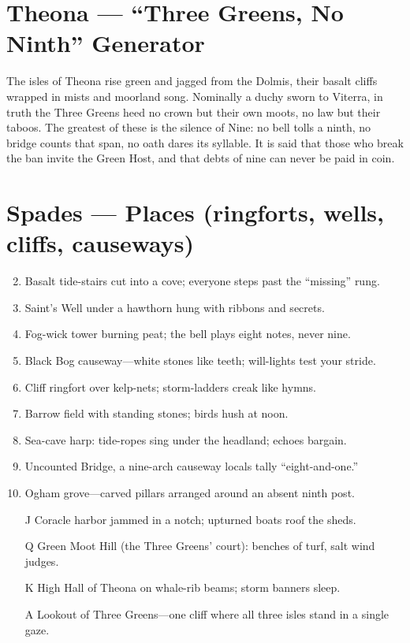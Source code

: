 \section{Theona --- ``Three Greens, No Ninth'' Generator}
\label{chap:theona}

The isles of Theona rise green and jagged from the Dolmis, their basalt cliffs wrapped in mists and moorland song. Nominally a duchy sworn to Viterra, in truth the Three Greens heed no crown but their own moots, no law but their taboos. The greatest of these is the silence of Nine: no bell tolls a ninth, no bridge counts that span, no oath dares its syllable. It is said that those who break the ban invite the Green Host, and that debts of nine can never be paid in coin.

\section*{Spades --- Places (ringforts, wells, cliffs, causeways)}
\begin{enumerate}
\setcounter{enumi}{1}
\item Basalt tide-stairs cut into a cove; everyone steps past the ``missing'' rung.
\item Saint's Well under a hawthorn hung with ribbons and secrets.
\item Fog-wick tower burning peat; the bell plays eight notes, never nine.
\item Black Bog causeway---white stones like teeth; will-lights test your stride.
\item Cliff ringfort over kelp-nets; storm-ladders creak like hymns.
\item Barrow field with standing stones; birds hush at noon.
\item Sea-cave harp: tide-ropes sing under the headland; echoes bargain.
\item Uncounted Bridge, a nine-arch causeway locals tally ``eight-and-one.''
\item Ogham grove---carved pillars arranged around an absent ninth post.
\item[J] Coracle harbor jammed in a notch; upturned boats roof the sheds.
\item[Q] Green Moot Hill (the Three Greens' court): benches of turf, salt wind judges.
\item[K] High Hall of Theona on whale-rib beams; storm banners sleep.
\item[A] Lookout of Three Greens---one cliff where all three isles stand in a single gaze.
\end{enumerate}

